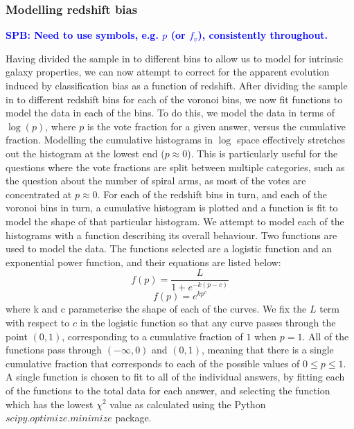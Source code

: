 \documentclass[useAMS,usenatbib]{mn2e}
\newcommand{\spb}[1]{{\bf \textcolor{blue}{SPB: #1}}}
\begin{document}
\subsubsection{Modelling redshift bias}

\spb{Need to use symbols, e.g. $p$ (or $f_v$), consistently throughout.}

Having divided the sample in to different bins to allow us to model for intrinsic galaxy properties, we can now attempt to correct for the apparent evolution induced by classification bias as a function of redshift. After dividing the sample in to different redshift bins for each of the voronoi bins, we now fit functions to model the data in each of the bins. To do this, we model the data in terms of $\log(p)$, where $p$ is the vote fraction for a given answer, versus the cumulative fraction. Modelling the cumulative histograms in $\log$ space effectively stretches out the histogram at the lowest end ($p \approx 0$). This is particularly useful for the questions where the vote fractions are split between multiple categories, such as the question about the number of spiral arms, as most of the votes are concentrated at $p \approx 0$. For each of the redshift bins in turn, and each of the voronoi bins in turn, a cumulative histogram is plotted and a function is fit to model the shape of that particular histogram. We attempt to model each of the histograms with a function describing its overall behaviour. Two functions are used to model the data. The functions selected are a logistic function and an exponential power function, and their equations are listed below:
\begin{equation}
f(p) = \frac{L}{1+e^{-k(p-c)}}
\end{equation}
\begin{equation}
f(p) = e^{kp^{c}}
\end{equation}
where k and c parameterise the shape of each of the curves. We fix the $L$ term with respect to $c$ in the logistic function so that any curve passes through the point $(0,1)$, corresponding to a cumulative fraction of $1$ when $p = 1$. All of the functions pass through $(-\infty,0)$ and $(0,1)$, meaning that there is a single cumulative fraction that corresponds to each of the possible values of $0 \leq p \leq 1$. A single function is chosen to fit to all of the individual answers, by fitting each of the functions to the total data for each answer, and selecting the function which has the lowest $\chi^2$ value as calculated using the Python $scipy.optimize.minimize$ package.
\end{document}
